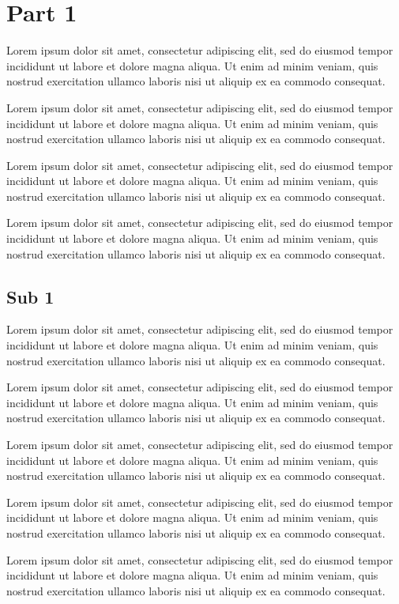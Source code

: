 \documentclass{article}
\begin{document}
\section{Part 1}
Lorem ipsum dolor sit amet, consectetur adipiscing elit, sed do eiusmod tempor incididunt ut labore et dolore magna aliqua. Ut enim ad minim veniam, quis nostrud exercitation ullamco laboris nisi ut aliquip ex ea commodo consequat.

Lorem ipsum dolor sit amet, consectetur adipiscing elit, sed do eiusmod tempor incididunt ut labore et dolore magna aliqua. Ut enim ad minim veniam, quis nostrud exercitation ullamco laboris nisi ut aliquip ex ea commodo consequat.

Lorem ipsum dolor sit amet, consectetur adipiscing elit, sed do eiusmod tempor incididunt ut labore et dolore magna aliqua. Ut enim ad minim veniam, quis nostrud exercitation ullamco laboris nisi ut aliquip ex ea commodo consequat.

Lorem ipsum dolor sit amet, consectetur adipiscing elit, sed do eiusmod tempor incididunt ut labore et dolore magna aliqua. Ut enim ad minim veniam, quis nostrud exercitation ullamco laboris nisi ut aliquip ex ea commodo consequat.

\subsection{Sub 1}
Lorem ipsum dolor sit amet, consectetur adipiscing elit, sed do eiusmod tempor incididunt ut labore et dolore magna aliqua. Ut enim ad minim veniam, quis nostrud exercitation ullamco laboris nisi ut aliquip ex ea commodo consequat.

Lorem ipsum dolor sit amet, consectetur adipiscing elit, sed do eiusmod tempor incididunt ut labore et dolore magna aliqua. Ut enim ad minim veniam, quis nostrud exercitation ullamco laboris nisi ut aliquip ex ea commodo consequat.

Lorem ipsum dolor sit amet, consectetur adipiscing elit, sed do eiusmod tempor incididunt ut labore et dolore magna aliqua. Ut enim ad minim veniam, quis nostrud exercitation ullamco laboris nisi ut aliquip ex ea commodo consequat.

Lorem ipsum dolor sit amet, consectetur adipiscing elit, sed do eiusmod tempor incididunt ut labore et dolore magna aliqua. Ut enim ad minim veniam, quis nostrud exercitation ullamco laboris nisi ut aliquip ex ea commodo consequat.

Lorem ipsum dolor sit amet, consectetur adipiscing elit, sed do eiusmod tempor incididunt ut labore et dolore magna aliqua. Ut enim ad minim veniam, quis nostrud exercitation ullamco laboris nisi ut aliquip ex ea commodo consequat.
\end{document}
